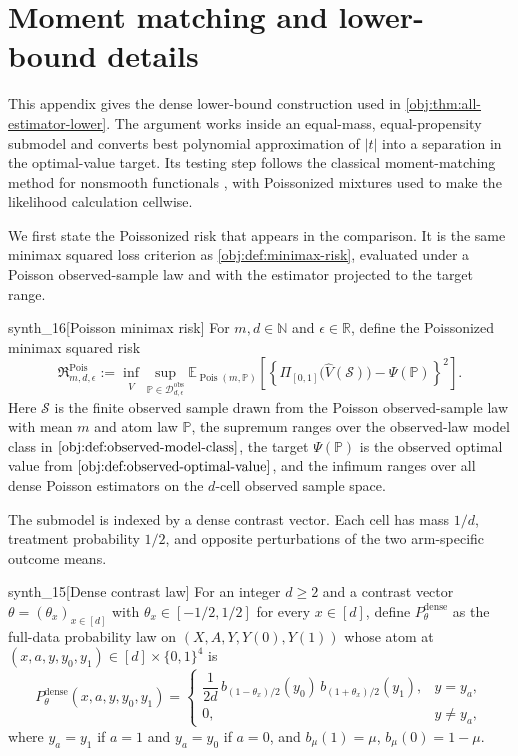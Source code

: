 \documentclass[11pt]{article}
\begin{document}
\section{Moment matching and lower-bound details}

This appendix gives the dense lower-bound construction used in \cref{obj:thm:all-estimator-lower}. The argument works inside an equal-mass, equal-propensity submodel and converts best polynomial approximation of \(|t|\) into a separation in the optimal-value target. Its testing step follows the classical moment-matching method for nonsmooth functionals \citep{CaiLow2011L1}, with Poissonized mixtures used to make the likelihood calculation cellwise.

We first state the Poissonized risk that appears in the comparison. It is the same minimax squared loss criterion as \cref{obj:def:minimax-risk}, evaluated under a Poisson observed-sample law and with the estimator projected to the target range.

\begin{definitionv}{synth_16}[Poisson minimax risk]
For \(m,d\in\mathbb N\) and \(\epsilon\in\mathbb R\), define the Poissonized minimax squared risk
\[
\mathfrak R^{\mathrm{Pois}}_{m,d,\epsilon}
:=
\inf_{\widehat V}
\sup_{\mathbb P\in\mathcal D_{d,\epsilon}^{\mathrm{obs}}}
\mathbb E_{\operatorname{Pois}(m,\mathbb P)}
\left[
\left\{
\Pi_{[0,1]}\bigl(\widehat V(\mathcal S)\bigr)
-\Psi(\mathbb P)
\right\}^{2}
\right].
\]
Here \(\mathcal S\) is the finite observed sample drawn from the Poisson observed-sample law with mean \(m\) and atom law \(\mathbb P\), the supremum ranges over the observed-law model class in \(\cref{obj:def:observed-model-class}\), the target \(\Psi(\mathbb P)\) is the observed optimal value from \(\cref{obj:def:observed-optimal-value}\), and the infimum ranges over all dense Poisson estimators on the \(d\)-cell observed sample space.
\end{definitionv}

The submodel is indexed by a dense contrast vector. Each cell has mass \(1/d\), treatment probability \(1/2\), and opposite perturbations of the two arm-specific outcome means.

\begin{definitionv}{synth_15}[Dense contrast law]
For an integer \(d\geq 2\) and a contrast vector \(\theta=(\theta_x)_{x\in[d]}\) with \(\theta_x\in[-1/2,1/2]\) for every \(x\in[d]\), define \(P_\theta^{\mathrm{dense}}\) as the full-data probability law on \((X,A,Y,Y(0),Y(1))\) whose atom at \((x,a,y,y_0,y_1)\in[d]\times\{0,1\}^4\) is
\[
P_\theta^{\mathrm{dense}}(x,a,y,y_0,y_1)
=
\begin{cases}
\dfrac{1}{2d}\, b_{(1-\theta_x)/2}(y_0)\, b_{(1+\theta_x)/2}(y_1),
& y=y_a,\\[0.8em]
0,
& y\neq y_a,
\end{cases}
\]
where \(y_a=y_1\) if \(a=1\) and \(y_a=y_0\) if \(a=0\), and \(b_\mu(1)=\mu\), \(b_\mu(0)=1-\mu\).
\end{definitionv}
\end{document}
